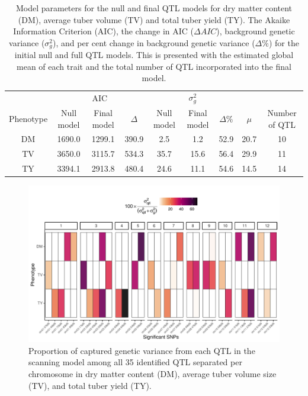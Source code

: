\hypertarget{tbl-summary}{}
\begin{table}
\caption{\label{tbl-summary}Model parameters for the null and final QTL models for dry matter
content (DM), average tuber volume (TV) and total tuber yield (TY). The
Akaike Information Criterion (AIC), the change in AIC (\(\Delta AIC\)),
background genetic variance (\(\sigma^2_g\)), and per cent change in
background genetic variance (\(\Delta \% \)) for the initial
null and full QTL models. This is presented with the estimated global
mean of each trait and the total number of QTL incorporated into the
final model. }\tabularnewline

\centering
\begin{tabular}{ccccccccc}
\toprule
\multicolumn{1}{c}{ } & \multicolumn{3}{c}{AIC} & \multicolumn{3}{c}{$\sigma^2_g$} & \multicolumn{2}{c}{ } \\
\cmidrule(l{3pt}r{3pt}){2-4} \cmidrule(l{3pt}r{3pt}){5-7}
Phenotype & Null model & Final model & $\Delta$ & Null model & Final model & $\Delta\%$ & $\mu$ & Number of
QTL\\
\midrule
DM & 1690.0 & 1299.1 & 390.9 & 2.5 & 1.2 & 52.9 & 20.7 & 10\\
TV & 3650.0 & 3115.7 & 534.3 & 35.7 & 15.6 & 56.4 & 29.9 & 11\\
TY & 3394.1 & 2913.8 & 480.4 & 24.6 & 11.1 & 54.6 & 14.5 & 14\\
\bottomrule
\end{tabular}
\end{table}

\begin{figure}

{\centering \includegraphics{figs_04/fig-gen-size-1.pdf}

}

\caption{\label{fig-gen-size}Proportion of captured genetic variance
from each QTL in the scanning model among all 35 identified QTL separated per chromosome in dry
matter content (DM), average tuber volume size (TV), and total tuber
yield (TY).}

\end{figure}

